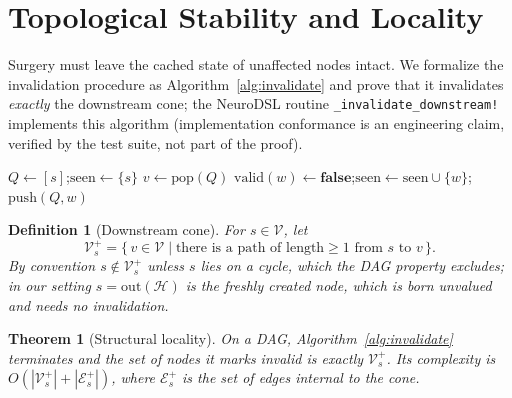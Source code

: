 \documentclass[11pt,a4paper]{article}
\newtheorem{theorem}{Theorem}
\newtheorem{definition}{Definition}
\newcommand{\G}{\mathcal{G}}
\newcommand{\Hb}{\mathcal{H}}
\newcommand{\V}{\mathcal{V}}
\newcommand{\E}{\mathcal{E}}
\begin{document}
\section{Topological Stability and Locality}
\label{sec:locality}

Surgery must leave the cached state of unaffected nodes intact. We formalize the invalidation procedure as Algorithm~\ref{alg:invalidate} and prove that it invalidates \emph{exactly} the downstream cone; the NeuroDSL routine \texttt{\_invalidate\_downstream!} implements this algorithm (implementation conformance is an engineering claim, verified by the test suite, not part of the proof).

\begin{algorithm}
\caption{\textsc{Invalidate}$(\G, s)$ --- reactive invalidation from a seed node $s$}
\label{alg:invalidate}
\begin{algorithmic}[1]
\State $Q \gets [s]$;\quad $\mathrm{seen} \gets \{s\}$
    \State $v \gets \mathrm{pop}(Q)$
    \For{each $w$ with $(v, w) \in \E$}
            \State $\mathrm{valid}(w) \gets \mathbf{false}$;\quad $\mathrm{seen} \gets \mathrm{seen} \cup \{w\}$;\quad $\mathrm{push}(Q, w)$
        \EndIf
    \EndFor
\EndWhile
\end{algorithmic}
\end{algorithm}

\begin{definition}[Downstream cone]
For $s \in \V$, let
\[
\V_s^{+} = \{\, v \in \V \mid \text{there is a path of length} \geq 1 \text{ from } s \text{ to } v \,\}.
\]
By convention $s \notin \V_s^{+}$ unless $s$ lies on a cycle, which the DAG property excludes; in our setting $s = \mathrm{out}(\Hb)$ is the freshly created node, which is born unvalued and needs no invalidation.
\end{definition}

\begin{theorem}[Structural locality]
\label{thm:locality}
On a DAG, Algorithm~\ref{alg:invalidate} terminates and the set of nodes it marks invalid is exactly $\V_s^{+}$. Its complexity is $O(|\V_s^{+}| + |\E_s^{+}|)$, where $\E_s^{+}$ is the set of edges internal to the cone.
\end{theorem}
\end{document}
